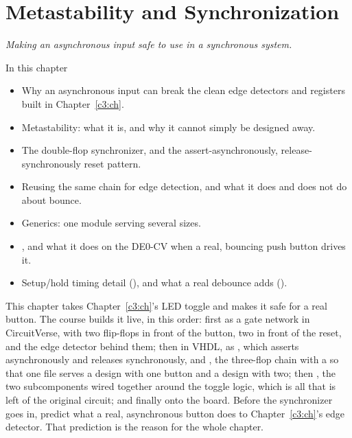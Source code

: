 
\chapter{Metastability and Synchronization}
\label{c4:ch}

{\large\itshape Making an asynchronous input safe to use in a synchronous system.\par}

\begin{chapterbox}{In this chapter}
\begin{itemize}
  \item Why an asynchronous input can break the clean edge detectors and registers built in
    Chapter~\ref{c3:ch}.
  \item Metastability: what it is, and why it cannot simply be designed away.
  \item The double-flop synchronizer, and the assert-asynchronously, release-synchronously reset
    pattern.
  \item Reusing the same chain for edge detection, and what it does and does not do about bounce.
  \item Generics: one module serving several sizes.
  \item {}, and what it does on the DE0-CV when a real, bouncing push button
    drives it.
  \item Setup/hold timing detail (), and what a real debounce adds ().
\end{itemize}
\end{chapterbox}

This chapter takes Chapter~\ref{c3:ch}'s LED toggle and makes it safe for a real button. The course
builds it live, in this order: first as a gate network in CircuitVerse, with two flip-flops in
front of the button, two in front of the reset, and the edge detector behind them; then in VHDL,
as , which asserts asynchronously and releases synchronously, and
, the three-flop chain with a  so that one file serves a design
with one button and a design with two; then , the two subcomponents wired
together around the toggle logic, which is all that is left of the original circuit; and finally
onto the board. Before the synchronizer goes in, predict what a real, asynchronous button does to
Chapter~\ref{c3:ch}'s edge detector. That prediction is the reason for the whole chapter.

